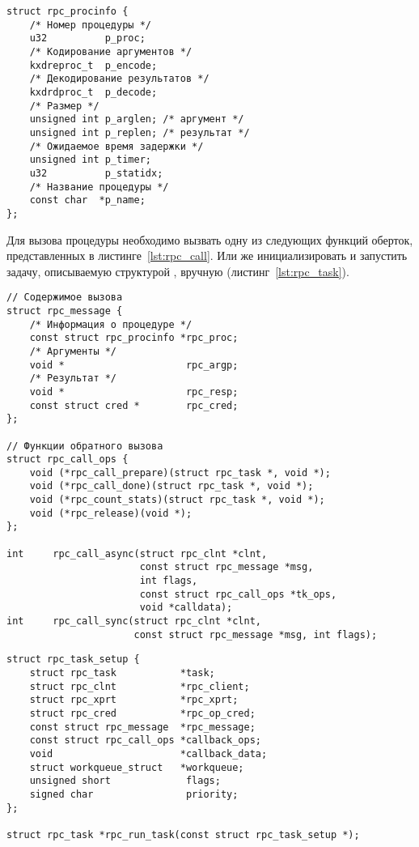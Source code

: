 \begin{lstlisting}[caption={Структура процедуры}, label={lst:struct_rpc_procedure}]
struct rpc_procinfo {
    /* Номер процедуры */
    u32          p_proc;
    /* Кодирование аргументов */
    kxdreproc_t  p_encode;
    /* Декодирование результатов */
    kxdrdproc_t  p_decode;
    /* Размер */
    unsigned int p_arglen; /* аргумент */
    unsigned int p_replen; /* результат */
    /* Ожидаемое время задержки */
    unsigned int p_timer;
    u32          p_statidx;
    /* Название процедуры */
    const char  *p_name;
};
\end{lstlisting}

Для вызова процедуры необходимо вызвать одну из следующих функций оберток,
представленных в листинге~\ref{lst:rpc_call}. Или же инициализировать и
запустить задачу, описываемую структурой , вручную
(листинг~\ref{lst:rpc_task}).

\begin{lstlisting}[caption={Прототип функций вызова удаленных процедур}, label={lst:rpc_call}]
// Содержимое вызова
struct rpc_message {
    /* Информация о процедуре */
    const struct rpc_procinfo *rpc_proc;
    /* Аргументы */
    void *                     rpc_argp;
    /* Результат */
    void *                     rpc_resp;
    const struct cred *        rpc_cred;
};

// Функции обратного вызова
struct rpc_call_ops {
    void (*rpc_call_prepare)(struct rpc_task *, void *);
    void (*rpc_call_done)(struct rpc_task *, void *);
    void (*rpc_count_stats)(struct rpc_task *, void *);
    void (*rpc_release)(void *);
};

int     rpc_call_async(struct rpc_clnt *clnt,
                       const struct rpc_message *msg,
                       int flags,
                       const struct rpc_call_ops *tk_ops,
                       void *calldata);
int     rpc_call_sync(struct rpc_clnt *clnt,
                      const struct rpc_message *msg, int flags);
\end{lstlisting}

\begin{lstlisting}[caption={Структура \code{rpc_task}}, label={lst:rpc_task}]
struct rpc_task_setup {
    struct rpc_task           *task;
    struct rpc_clnt           *rpc_client;
    struct rpc_xprt           *rpc_xprt;
    struct rpc_cred           *rpc_op_cred;
    const struct rpc_message  *rpc_message;
    const struct rpc_call_ops *callback_ops;
    void                      *callback_data;
    struct workqueue_struct   *workqueue;
    unsigned short             flags;
    signed char                priority;
};

struct rpc_task *rpc_run_task(const struct rpc_task_setup *);
\end{lstlisting}

